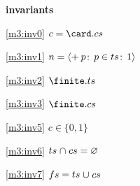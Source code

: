 \textbf{invariants}
\begin{block}
\item[ \eqref{m3:inv0} ]$c = \card.cs $ %
\item[ \eqref{m3:inv1} ]$n = { \langle + \:p\!:\, p \in ts\!:\, 1 \rangle } $ %
\item[ \eqref{m3:inv2} ]$\finite.ts $ %
\item[ \eqref{m3:inv3} ]$\finite.cs $ %
\item[ \eqref{m3:inv5} ]$c \in \{0,1\} $ %
\item[ \eqref{m3:inv6} ]$ts \mathbin{\mkern1mu\cap\mkern1mu} cs = \mathord\varnothing $ %
\item[ \eqref{m3:inv7} ]$fs = ts \mathbin{\mkern1mu\cup\mkern1mu} cs $ %
\end{block}
